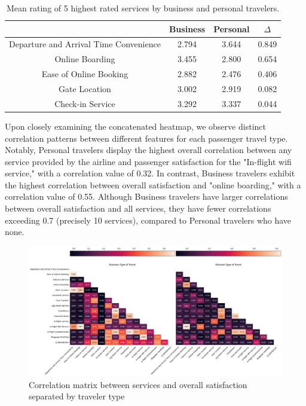 \documentclass[11pt]{article}
\begin{document}
\begin{table}[!h]
    \centering
    \begin{tabular}{|c|c|c|c|}
        \hline
                                               & Business & Personal & $\Delta$ \\
        \hline
        Departure and Arrival Time Convenience & 2.794  & 3.644 & 0.849 \\
        \hline
        Online Boarding                        & 3.455 & 2.800 & 0.654 \\
        \hline
        Ease of Online Booking                 & 2.882 & 2.476 & 0.406 \\
        \hline
        Gate Location                          & 3.002 & 2.919 & 0.082 \\
        \hline
        Check-in Service                       & 3.292 &    3.337 & 0.044 \\
        \hline
    \end{tabular}
    \caption{\centering Mean rating of 5 highest rated services by business and personal travelers.}
    \label{tab:7-4-3}
\end{table}


Upon closely examining the concatenated heatmap, we observe distinct correlation patterns between different features for each passenger travel type. Notably, Personal travelers display the highest overall correlation between any service provided by the airline and passenger satisfaction for the "In-flight wifi service," with a correlation value of 0.32. In contrast, Business travelers exhibit the highest correlation between overall satisfaction and "online boarding," with a correlation value of 0.55. Although Business travelers have larger correlations between overall satisfaction and all services, they have fewer correlations exceeding 0.7 (precisely 10 services), compared to Personal travelers who have none.


\begin{figure}[h]
\centering
\includegraphics[width=0.9\linewidth]{project_files/project_78_0.png}
\caption{\centering Correlation matrix between services and overall satisfaction separated by traveler type}
\end{figure}
\end{document}
